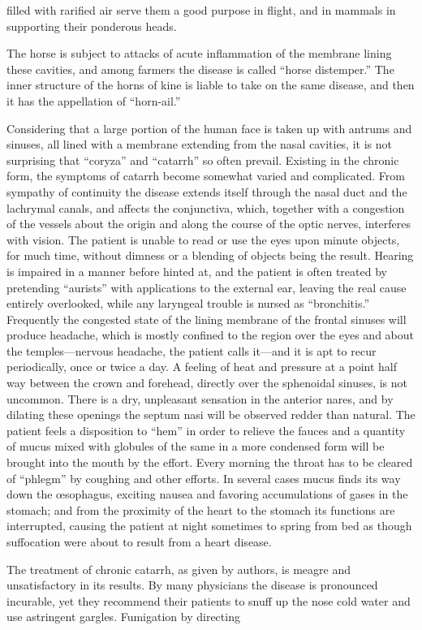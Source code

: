 filled with rarified air serve them a good purpose in flight, and in
mammals in supporting their ponderous heads.

The horse is subject to attacks of acute inflammation of the membrane
lining these cavities, and among farmers the disease is called ``horse
distemper.'' The inner structure of the horns of kine is liable to take
on the same disease, and then it has the appellation of ``horn-ail.''

Considering that a large portion of the human face is taken up with
antrums and sinuses, all lined with a membrane extending from the nasal
cavities, it is not surprising that ``coryza'' and ``catarrh'' so often prevail.
Existing in the chronic form, the symptoms of catarrh become
somewhat varied and complicated. From sympathy of continuity the
disease extends itself through the nasal duct and the lachrymal canals,
and affects the conjunctiva, which, together with a congestion of the
vessels about the origin and along the course of the optic nerves, interferes
with vision. The patient is unable to read or use the eyes upon
minute objects, for much time, without dimness or a blending of objects
being the result. Hearing is impaired in a manner before hinted at,
and the patient is often treated by pretending ``aurists'' with applications
to the external ear, leaving the real cause entirely overlooked,
while any laryngeal trouble is nursed as ``bronchitis.'' Frequently the
congested state of the lining membrane of the frontal sinuses will produce
headache, which is mostly confined to the region over the eyes and
about the temples---nervous headache, the patient calls it---and it is apt to
recur periodically, once or twice a day. A feeling of heat and pressure
at a point half way between the crown and forehead, directly over the
sphenoidal sinuses, is not uncommon. There is a dry, unpleasant sensation
in the anterior nares, and by dilating these openings the septum nasi
will be observed redder than natural. The patient feels a disposition to
``hem'' in order to relieve the fauces and a quantity of mucus mixed with
globules of the same in a more condensed form will be brought into the
mouth by the effort. Every morning the throat has to be cleared of
``phlegm'' by coughing and other efforts. In several cases mucus finds
its way down the œsophagus, exciting nausea and favoring accumulations
of gases in the stomach; and from the proximity of the heart to the
stomach its functions are interrupted, causing the patient at night sometimes
to spring from bed as though suffocation were about to result from
a heart disease.

The treatment of chronic catarrh, as given by authors, is meagre and
unsatisfactory in its results. By many physicians the disease is pronounced
incurable, yet they recommend their patients to snuff up the
nose cold water and use astringent gargles.   Fumigation by directing\endinput
